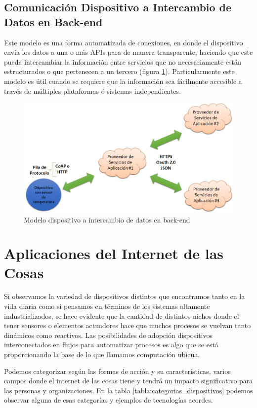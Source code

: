 \subsection{Comunicación Dispositivo a Intercambio de Datos en Back-end}
Este modelo es una forma automatizada de conexiones, en donde el dispositivo envía los datos a una o más APIs para de manera transparente, haciendo que este pueda intercambiar la información entre servicios que no necesariamente están estructurados o que pertenecen a un tercero (figura \ref{fig:d2b}). Particularmente este modelo es útil cuando se requiere que la información sea fácilmente accesible a través de múltiples plataformas ó sistemas independientes.
\begin{figure}[htb]
\centering
\includegraphics[scale=0.38]{./Figuras/d2b.png}
\caption{Modelo dispositivo a intercambio de datos en back-end}
\label{fig:d2b}
\vspace*{-10pt}
\end{figure}

\section{Aplicaciones del Internet de las Cosas}
Si observamos la variedad de dispositivos distintos que encontramos tanto en la vida diaria como si pensamos en términos de los sistemas altamente industrializados, se hace evidente que la cantidad de distintos nichos donde el tener sensores o elementos actuadores hace que muchos procesos se vuelvan tanto dinámicos como reactivos. Las posibilidades de adopción dispositivos interconectados en flujos para automatizar procesos es algo que se está proporcionando la base de lo que llamamos computación ubicua.

Podemos categorizar según las formas de acción y su características, varios campos donde el internet de las cosas tiene y tendrá un impacto significativo para las personas y organizaciones. En la tabla \ref{tabla:categorias_dispositivos} podemos observar alguna de esas categorías y ejemplos de tecnologías acordes\cite{tablaiot}.

